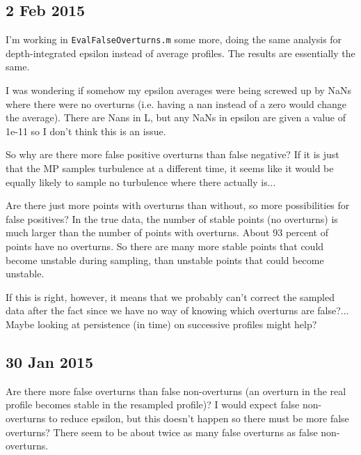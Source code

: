 \documentclass[11pt]{article}
\begin{document}
\clearpage
\newpage
\subsection{2 Feb 2015}

I'm working in \verb+EvalFalseOverturns.m+ some more, doing the same analysis for depth-integrated epsilon instead of average profiles. The results are essentially the same. 

\vspace{1cm}

I was wondering if somehow my epsilon averages were being screwed up by NaNs where there were no overturns (i.e. having a nan instead of a zero would change the average). There are Nans in L, but any NaNs in epsilon are given a value of 1e-11 so I don't think this is an issue.

\vspace{1cm}

So why are there more false positive overturns than false negative? If it is just that the MP samples turbulence at a different time, it seems like it would be equally likely to sample no turbulence where there actually is...

Are there just more points with overturns than without, so more possibilities for false positives? In the true data, the number of stable points (no overturns) is much larger than the number of points with overturns. About 93 percent of points have no overturns. So there are many more stable points that could become unstable during sampling, than unstable points that could become unstable.

If this is right, however, it means that we probably can't correct the sampled data after the fact since we have no way of knowing which overturns are false?... Maybe looking at persistence (in time) on successive profiles might help? 


\clearpage
\newpage
\subsection{30 Jan 2015}

Are there more false overturns than false non-overturns (an overturn in the real profile becomes stable in the resampled profile)? I would expect false non-overturns to reduce epsilon, but this doesn't happen so there must be more false overturns? There seem to be about twice as many false overturns as false non-overturns.

\vspace{1cm}
\end{document}
